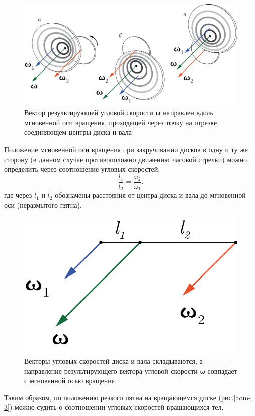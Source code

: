 \documentclass[14pt,a4paper,twoside]{extarticle}	%
\begin{document}
\begin{figure}[H]
	\centering 	
	\includegraphics[width=0.9\linewidth]{aom-5.png}
	\caption{Вектор результирующей угловой скорости \textbf{ω} направлен вдоль мгновенной оси вращения, проходящей через точку на отрезке, соединяющем центры диска и вала}
	\label{aom-5}
\end{figure}

Положение мгновенной оси вращения при закручивании дисков в одну и ту же сторону (в данном случае противоположно движению часовой стрелки) можно определить через соотношение угловых скоростей:
$$
\dfrac{l_1}{l_2}  = \dfrac{\omega_2}{\omega_1}.
$$
где через $ l_1 $ и $ l_2 $ обозначены расстояния от центра диска и вала до мгновенной оси (неразмытого пятна).

\begin{figure}[H]
	\centering 	
	\includegraphics[width=0.3\linewidth]{aom-6.png}
	\caption{Векторы угловых скоростей диска и вала складываются, а направление результирующего вектора угловой скорости $\textbf{ω}$ совпадает с мгновенной осью вращения}
	\label{aom-6}
\end{figure}

Таким образом, по положению резкого пятна на вращающемся диске (рис.\ref{aom-3}) можно судить о соотношении угловых скоростей вращающихся тел.
\end{document}

